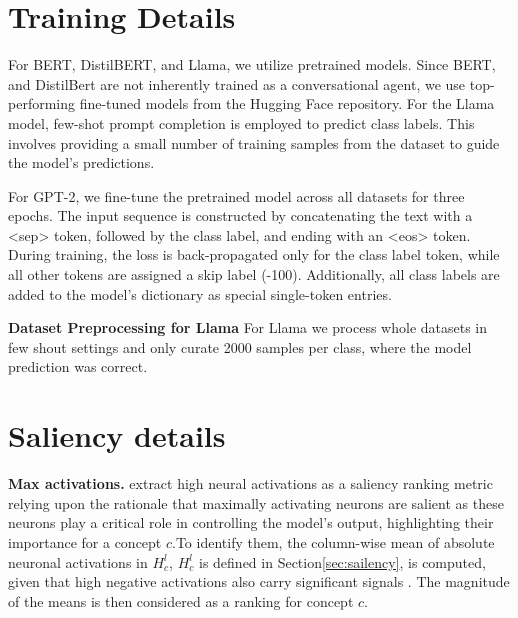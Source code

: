 \section{Training Details}
\label{sec_experimental_appendix}

For BERT, DistilBERT, and Llama, we utilize pretrained models. Since BERT, and DistilBert are not inherently trained as a conversational agent, we use top-performing fine-tuned models from the Hugging Face repository. For the Llama model, few-shot prompt completion is employed to predict class labels. This involves providing a small number of training samples from the dataset to guide the model’s predictions.

For GPT-2, we fine-tune the pretrained model across all datasets for three epochs. The input sequence is constructed by concatenating the text with a \textless{}sep\textgreater{} token, followed by the class label, and ending with an \textless{}eos\textgreater{} token. During training, the loss is back-propagated only for the class label token, while all other tokens are assigned a skip label (-100). Additionally, all class labels are added to the model’s dictionary as special single-token entries.

\textbf{Dataset Preprocessing for Llama}
For Llama we process whole datasets in few shout settings and only curate 2000 samples per class, where the model prediction was correct.

\section{Saliency details}
\label{sec:sec_sailiency_details}

\textbf{Max activations.} \citet{frankle2019lotterytickethypothesisfinding} extract high neural activations as a saliency ranking metric relying upon the rationale that maximally activating neurons are salient as these neurons play a critical role in controlling the model's output, highlighting their importance for a concept $c$.To identify them, the column-wise mean of absolute neuronal activations in $H^l_c$, $H^l_c$ is defined in Section\ref{sec:sailency}, is computed, given that high negative activations also carry significant signals \citep{voita2023neurons}. The magnitude of the means is then considered as a ranking for concept $c$.

